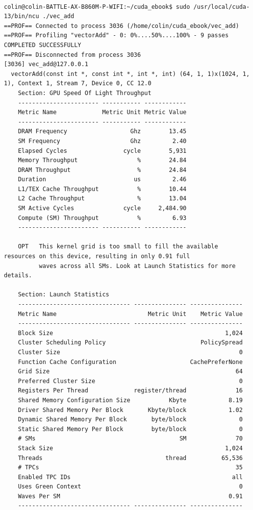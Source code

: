 \begin{lstlisting}

colin@colin-BATTLE-AX-B860M-P-WIFI:~/cuda_ebook$ sudo /usr/local/cuda-13/bin/ncu ./vec_add
==PROF== Connected to process 3036 (/home/colin/cuda_ebook/vec_add)
==PROF== Profiling "vectorAdd" - 0: 0%....50%....100% - 9 passes
COMPLETED SUCCESSFULLY
==PROF== Disconnected from process 3036
[3036] vec_add@127.0.0.1
  vectorAdd(const int *, const int *, int *, int) (64, 1, 1)x(1024, 1, 1), Context 1, Stream 7, Device 0, CC 12.0
    Section: GPU Speed Of Light Throughput
    ----------------------- ----------- ------------
    Metric Name             Metric Unit Metric Value
    ----------------------- ----------- ------------
    DRAM Frequency                  Ghz        13.45
    SM Frequency                    Ghz         2.40
    Elapsed Cycles                cycle        5,931
    Memory Throughput                 %        24.84
    DRAM Throughput                   %        24.84
    Duration                         us         2.46
    L1/TEX Cache Throughput           %        10.44
    L2 Cache Throughput               %        13.04
    SM Active Cycles              cycle     2,484.90
    Compute (SM) Throughput           %         6.93
    ----------------------- ----------- ------------

    OPT   This kernel grid is too small to fill the available resources on this device, resulting in only 0.91 full
          waves across all SMs. Look at Launch Statistics for more details.

    Section: Launch Statistics
    -------------------------------- --------------- ---------------
    Metric Name                          Metric Unit    Metric Value
    -------------------------------- --------------- ---------------
    Block Size                                                 1,024
    Cluster Scheduling Policy                           PolicySpread
    Cluster Size                                                   0
    Function Cache Configuration                     CachePreferNone
    Grid Size                                                     64
    Preferred Cluster Size                                         0
    Registers Per Thread             register/thread              16
    Shared Memory Configuration Size           Kbyte            8.19
    Driver Shared Memory Per Block       Kbyte/block            1.02
    Dynamic Shared Memory Per Block       byte/block               0
    Static Shared Memory Per Block        byte/block               0
    # SMs                                         SM              70
    Stack Size                                                 1,024
    Threads                                   thread          65,536
    # TPCs                                                        35
    Enabled TPC IDs                                              all
    Uses Green Context                                             0
    Waves Per SM                                                0.91
    -------------------------------- --------------- ---------------


\end{lstlisting}
